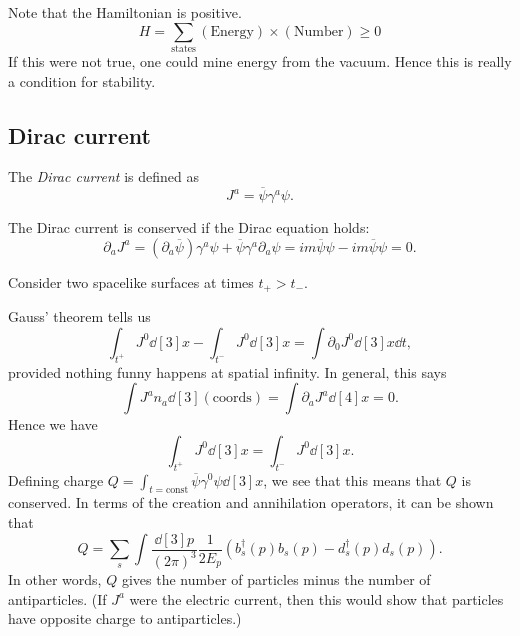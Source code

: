 \documentclass{jknotes} %
\begin{document}
Note that the Hamiltonian is positive.
\begin{equation}
    H = \sum_{\text{states}} (\text{Energy})\times(\text{Number}) \ge 0
\end{equation}
If this were not true, one could mine energy from the vacuum. Hence this is really a condition for stability.

\subsection{Dirac current}
\begin{defn}
    The \emph{Dirac current} is defined as
    \begin{equation}
        J^a = \overline{\psi}\gamma^a\psi.
    \end{equation}
\end{defn}
The Dirac current is conserved if the Dirac equation holds:
\begin{equation}
    \partial_aJ^a = (\partial_a\overline{\psi})\gamma^a\psi + \overline{\psi}\gamma^a\partial_a\psi = im\overline{\psi}\psi - im\overline{\psi}\psi = 0.
\end{equation}

Consider two spacelike surfaces at times \(t_+>t_-\).
\begin{figure}[H]
    \centering
\end{figure}
Gauss' theorem tells us
\begin{equation}
    \int_{t^+}J^0\dd[3]{x} - \int_{t^-}J^0\dd[3]{x} = \int \partial_0 J^0\dd[3]{x}\dd{t},
\end{equation}
provided nothing funny happens at spatial infinity. In general, this says 
\begin{equation}
    \int J^a n_a\dd[3]{(\text{coords})}=\int\partial_a J^a\dd[4]{x} = 0.
\end{equation}
Hence we have
\begin{equation}
    \int_{t^+} J^0\dd[3]{x} = \int_{t^-} J^0 \dd[3]{x}.
\end{equation}
Defining charge \(Q = \int_{t=\text{const}} \overline{\psi}\gamma^0\psi\dd[3]{x}\), we see that this means that \(Q\) is conserved. In terms of the creation and annihilation operators, it can be shown that
\begin{equation}
    Q = \sum_s \int\frac{\dd[3]{p}}{(2\pi)^3}\frac{1}{2E_p}(b_s^\dagger(p)b_s(p) - d_s^\dagger(p)d_s(p)).
\end{equation}
In other words, \(Q\) gives the number of particles minus the number of antiparticles. (If \(J^a\) were the electric current, then this would show that particles have opposite charge to antiparticles.)
\end{document}
